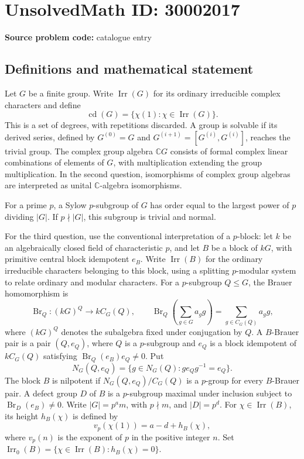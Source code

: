 \documentclass[11pt]{article}
\newcommand{\C}{\mathbb{C}}
\begin{document}
\section*{UnsolvedMath ID: 30002017}
\textbf{Source problem code:} catalogue entry
\subsection{Definitions and mathematical statement}
Let \(G\) be a finite group. Write \(\operatorname{Irr}(G)\) for its ordinary irreducible complex characters and define
\[
\operatorname{cd}(G)=\{\chi(1):\chi\in\operatorname{Irr}(G)\}.
\]
This is a set of degrees, with repetitions discarded. A group is solvable if its derived series, defined by \(G^{(0)}=G\) and \(G^{(i+1)}=[G^{(i)},G^{(i)}]\), reaches the trivial group. The complex group algebra \(\C G\) consists of formal complex linear combinations of elements of \(G\), with multiplication extending the group multiplication. In the second question, isomorphisms of complex group algebras are interpreted as unital \(\C\)-algebra isomorphisms.

For a prime \(p\), a Sylow \(p\)-subgroup of \(G\) has order equal to the largest power of \(p\) dividing \(|G|\). If \(p\nmid |G|\), this subgroup is trivial and normal.

For the third question, use the conventional interpretation of a \(p\)-block: let \(k\) be an algebraically closed field of characteristic \(p\), and let \(B\) be a block of \(kG\), with primitive central block idempotent \(e_B\). Write \(\operatorname{Irr}(B)\) for the ordinary irreducible characters belonging to this block, using a splitting \(p\)-modular system to relate ordinary and modular characters. For a \(p\)-subgroup \(Q\leq G\), the Brauer homomorphism is
\[
\operatorname{Br}_Q:(kG)^Q\longrightarrow kC_G(Q),\qquad
\operatorname{Br}_Q\!\left(\sum_{g\in G}a_g g\right)=\sum_{g\in C_G(Q)}a_g g,
\]
where \((kG)^Q\) denotes the subalgebra fixed under conjugation by \(Q\). A \(B\)-Brauer pair is a pair \((Q,e_Q)\), where \(Q\) is a \(p\)-subgroup and \(e_Q\) is a block idempotent of \(kC_G(Q)\) satisfying \(\operatorname{Br}_Q(e_B)e_Q\ne0\). Put
\[
N_G(Q,e_Q)=\{g\in N_G(Q):g e_Qg^{-1}=e_Q\}.
\]
The block \(B\) is nilpotent if \(N_G(Q,e_Q)/C_G(Q)\) is a \(p\)-group for every \(B\)-Brauer pair. A defect group \(D\) of \(B\) is a \(p\)-subgroup maximal under inclusion subject to \(\operatorname{Br}_D(e_B)\ne0\). Write \(|G|=p^a m\), with \(p\nmid m\), and \(|D|=p^d\). For \(\chi\in\operatorname{Irr}(B)\), its height \(h_B(\chi)\) is defined by
\[
v_p(\chi(1))=a-d+h_B(\chi),
\]
where \(v_p(n)\) is the exponent of \(p\) in the positive integer \(n\). Set \(\operatorname{Irr}_0(B)=\{\chi\in\operatorname{Irr}(B):h_B(\chi)=0\}\).
\end{document}
